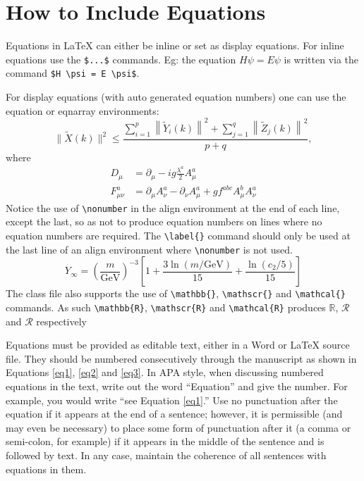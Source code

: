 \documentclass[12pt,a4paper]{article}
\begin{document}
\section{How to Include Equations}\label{sec4}

Equations in \LaTeX{} can either be inline or set as display equations. For
inline equations use the \verb+$...$+ commands. Eg: the equation
$H\psi = E \psi$ is written via the command \verb+$H \psi = E \psi$+.

For display equations (with auto generated equation numbers)
one can use the equation or eqnarray environments:
\begin{equation}
\|\tilde{X}(k)\|^2 \leq\frac{\sum\limits_{i=1}^{p}\left\|\tilde{Y}_i(k)\right\|^2+\sum\limits_{j=1}^{q}\left\|\tilde{Z}_j(k)\right\|^2 }{p+q},
\label{eq1}
\end{equation}
where
\begin{align}
D_\mu &=  \partial_\mu - ig \frac{\lambda^a}{2} A^a_\mu \nonumber \\
F^a_{\mu\nu} &= \partial_\mu A^a_\nu - \partial_\nu A^a_\mu + g f^{abc} A^b_\mu A^a_\nu
\label{eq2}
\end{align}
Notice the use of \verb+\nonumber+ in the align environment at the end
of each line, except the last, so as not to produce equation numbers on
lines where no equation numbers are required. The \verb+\label{}+ command
should only be used at the last line of an align environment where
\verb+\nonumber+ is not used.
\begin{equation}
Y_\infty = \left( \frac{m}{\textrm{GeV}} \right)^{-3}
    \left[ 1 + \frac{3 \ln(m/\textrm{GeV})}{15}
    + \frac{\ln(c_2/5)}{15} \right]
\label{eq3}
\end{equation}
The class file also supports the use of \verb+\mathbb{}+, \verb+\mathscr{}+ and
\verb+\mathcal{}+ commands. As such \verb+\mathbb{R}+, \verb+\mathscr{R}+
and \verb+\mathcal{R}+ produces $\mathbb{R}$, $\mathscr{R}$ and $\mathcal{R}$
respectively 

Equations must be provided as editable text, either in a Word or LaTeX source file. They should be numbered consecutively through the manuscript as shown in Equations \ref{eq1}, \ref{eq2} and \ref{eq3}. In APA style, when discussing numbered equations in the text, write out the word “Equation” and give the number. For example, you would write “see Equation \ref{eq1}.”
Use no punctuation after the equation if it appears at the end of a sentence; however, it is permissible (and may even be necessary) to place some form of punctuation after it (a comma or semi-colon, for example) if it appears in the middle of the sentence and is followed by text. In any case, maintain the coherence of all sentences with equations in them.
\end{document}
